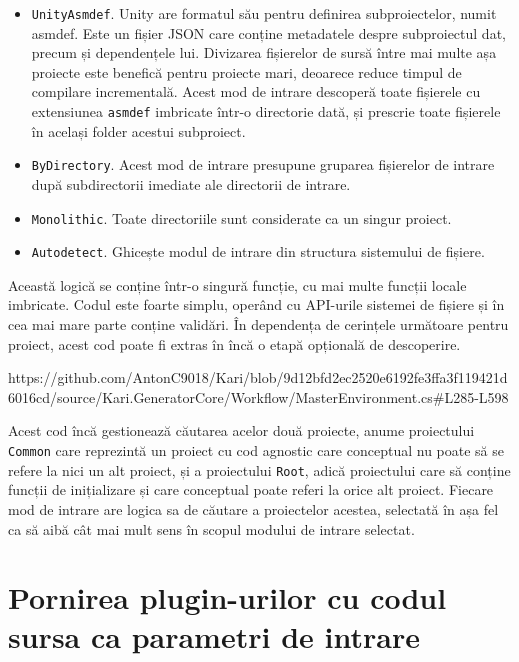 \documentclass[a4paper,12pt]{report}
\begin{document}
\begin{itemize}
  \item \texttt{UnityAsmdef}.
    Unity are formatul său pentru definirea subproiectelor, numit asmdef.
    Este un fișier JSON care conține metadatele despre subproiectul dat, precum și dependențele lui.
    Divizarea fișierelor de sursă între mai multe așa proiecte este benefică pentru proiecte mari, deoarece reduce timpul de compilare incrementală.
    Acest mod de intrare descoperă toate fișierele cu extensiunea \texttt{asmdef} imbricate într-o directorie dată, și prescrie toate fișierele în același folder acestui subproiect.

  \item \texttt{ByDirectory}. Acest mod de intrare presupune gruparea fișierelor de intrare după subdirectorii imediate ale directorii de intrare.

  \item \texttt{Monolithic}. Toate directoriile sunt considerate ca un singur proiect.

  \item \texttt{Autodetect}. Ghicește modul de intrare din structura sistemului de fișiere.
\end{itemize}

Această logică se conține într-o singură funcție, cu mai multe funcții locale imbricate.
Codul este foarte simplu, operând cu API-urile sistemei de fișiere și în cea mai mare parte conține validări.
În dependența de cerințele următoare pentru proiect, acest cod poate fi extras în încă o etapă opțională de descoperire.

https://github.com/AntonC9018/Kari/blob/9d12bfd2ec2520e6192fe3ffa3f119421d6016cd/source/Kari.GeneratorCore/Workflow/MasterEnvironment.cs#L285-L598

Acest cod încă gestionează căutarea acelor două proiecte, anume proiectului \texttt{Common} care reprezintă un proiect cu cod agnostic care conceptual nu poate să se refere la nici un alt proiect, și a proiectului \texttt{Root}, adică proiectului care să conține funcții de inițializare și care conceptual poate referi la orice alt proiect.
Fiecare mod de intrare are logica sa de căutare a proiectelor acestea, selectată în așa fel ca să aibă cât mai mult sens în scopul modului de intrare selectat.

\section{Pornirea plugin-urilor cu codul sursa ca parametri de intrare}
\end{document}
